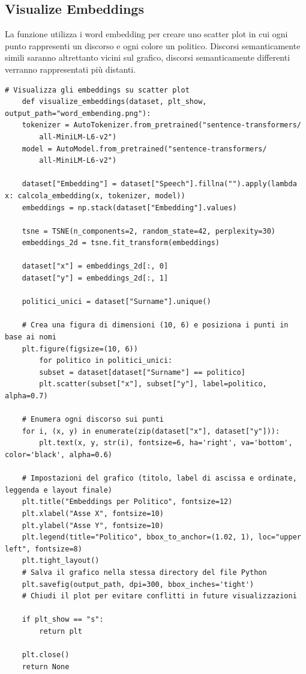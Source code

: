 \documentclass{article}
\begin{document}
		\subsection{Visualize Embeddings}
La funzione utilizza i word embedding per creare uno scatter plot in cui ogni punto rappresenti un discorso e ogni colore un politico. Discorsi semanticamente simili saranno altrettanto vicini sul grafico, discorsi semanticamente differenti verranno rappresentati più distanti.
	\begin{lstlisting}
# Visualizza gli embeddings su scatter plot
	def visualize_embeddings(dataset, plt_show, output_path="word_embending.png"):
	tokenizer = AutoTokenizer.from_pretrained("sentence-transformers/
		all-MiniLM-L6-v2")
	model = AutoModel.from_pretrained("sentence-transformers/
		all-MiniLM-L6-v2")
	
	dataset["Embedding"] = dataset["Speech"].fillna("").apply(lambda x: calcola_embedding(x, tokenizer, model))
	embeddings = np.stack(dataset["Embedding"].values)
	
	tsne = TSNE(n_components=2, random_state=42, perplexity=30)
	embeddings_2d = tsne.fit_transform(embeddings)
	
	dataset["x"] = embeddings_2d[:, 0]
	dataset["y"] = embeddings_2d[:, 1]
	
	politici_unici = dataset["Surname"].unique()
	
	# Crea una figura di dimensioni (10, 6) e posiziona i punti in base ai nomi
	plt.figure(figsize=(10, 6))
		for politico in politici_unici:
		subset = dataset[dataset["Surname"] == politico]
		plt.scatter(subset["x"], subset["y"], label=politico, alpha=0.7)

	# Enumera ogni discorso sui punti 
	for i, (x, y) in enumerate(zip(dataset["x"], dataset["y"])):
		plt.text(x, y, str(i), fontsize=6, ha='right', va='bottom', color='black', alpha=0.6)

	# Impostazioni del grafico (titolo, label di ascissa e ordinate, leggenda e layout finale)
	plt.title("Embeddings per Politico", fontsize=12)
	plt.xlabel("Asse X", fontsize=10)
	plt.ylabel("Asse Y", fontsize=10)
	plt.legend(title="Politico", bbox_to_anchor=(1.02, 1), loc="upper left", fontsize=8)
	plt.tight_layout()
	# Salva il grafico nella stessa directory del file Python
	plt.savefig(output_path, dpi=300, bbox_inches='tight')
	# Chiudi il plot per evitare conflitti in future visualizzazioni
	
	if plt_show == "s":
		return plt
	
	plt.close()
	return None
	\end{lstlisting}
\end{document}
